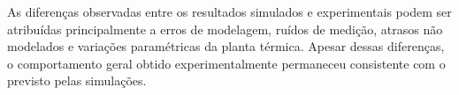 As diferenças observadas entre os resultados simulados e experimentais podem ser
atribuídas principalmente a erros de modelagem, ruídos de medição, atrasos não
modelados e variações paramétricas da planta térmica. Apesar dessas diferenças,
o comportamento geral obtido experimentalmente permaneceu consistente com o
previsto pelas simulações.
